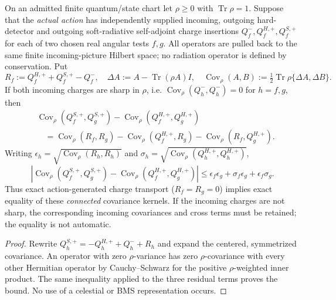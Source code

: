 \documentclass[12pt,a4paper]{article}
\begin{document}
\begin{theorem}
\label{p4b:thm:v254-in-in-charge-detector-covariance}
On an admitted finite quantum/state chart let $\rho\ge0$ with
$\operatorname{Tr}\rho=1$. Suppose that the \emph{actual action} has
independently supplied incoming, outgoing hard-detector and outgoing
soft-radiative self-adjoint charge insertions $Q^-_f,Q^{H,+}_f,Q^{S,+}_f$
for each of two chosen real angular tests $f,g$. All operators are pulled
back to the same finite incoming-picture Hilbert space; no radiation
operator is defined by conservation. Put
\[
R_f:=Q^{H,+}_f+Q^{S,+}_f-Q^-_f,\quad
\Delta A:=A-\operatorname{Tr}(\rho A)I,\quad
\operatorname{Cov}_\rho(A,B):=\tfrac12\operatorname{Tr}\rho\{\Delta A,\Delta B\}.
\]
If both incoming charges are sharp in $\rho$, i.e.
$\operatorname{Cov}_\rho(Q^-_h,Q^-_h)=0$ for $h=f,g$, then
\begin{align}
 &\operatorname{Cov}_\rho(Q^{S,+}_f,Q^{S,+}_g)
   -\operatorname{Cov}_\rho(Q^{H,+}_f,Q^{H,+}_g) \nonumber\\
 &\quad=\operatorname{Cov}_\rho(R_f,R_g)
       -\operatorname{Cov}_\rho(Q^{H,+}_f,R_g)
       -\operatorname{Cov}_\rho(R_f,Q^{H,+}_g).
\label{p4b:eq:v254-charge-covariance}
\end{align}
Writing $\epsilon_h=\sqrt{\operatorname{Cov}_\rho(R_h,R_h)}$
and $\sigma_h=\sqrt{\operatorname{Cov}_\rho(Q^{H,+}_h,Q^{H,+}_h)}$,
\[
\left|\operatorname{Cov}_\rho(Q^{S,+}_f,Q^{S,+}_g)
-\operatorname{Cov}_\rho(Q^{H,+}_f,Q^{H,+}_g)\right|
\le\epsilon_f\epsilon_g+\sigma_f\epsilon_g+\epsilon_f\sigma_g.
\]
Thus exact action-generated charge transport ($R_f=R_g=0$) implies
exact equality of these \emph{connected} covariance kernels. If the
incoming charges are not sharp, the corresponding incoming covariances
and cross terms must be retained; the equality is not automatic.
\end{theorem}
\begin{proof}
Rewrite $Q^{S,+}_h=-Q^{H,+}_h+Q^-_h+R_h$ and expand the centered,
symmetrized covariance. An operator with zero $\rho$-variance has
zero $\rho$-covariance with every other Hermitian operator by
Cauchy--Schwarz for the positive $\rho$-weighted inner product.
The same inequality applied to the three residual terms proves the
bound. No use of a celestial or BMS representation occurs.
\end{proof}
\end{document}

